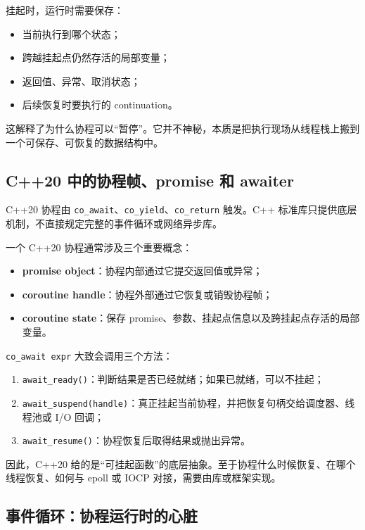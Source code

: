 \documentclass[UTF8,zihao=-4]{ctexart}
\begin{document}
挂起时，运行时需要保存：
\begin{itemize}
  \item 当前执行到哪个状态；
  \item 跨越挂起点仍然存活的局部变量；
  \item 返回值、异常、取消状态；
  \item 后续恢复时要执行的 continuation。
\end{itemize}

这解释了为什么协程可以“暂停”。它并不神秘，本质是把执行现场从线程栈上搬到一个可保存、可恢复的数据结构中。

\subsection{C++20 中的协程帧、promise 和 awaiter}

C++20 协程由 \texttt{co\_await}、\texttt{co\_yield}、\texttt{co\_return} 触发。C++ 标准库只提供底层机制，不直接规定完整的事件循环或网络异步库。

一个 C++20 协程通常涉及三个重要概念\cite{cppref}：

\begin{itemize}
  \item \textbf{promise object}：协程内部通过它提交返回值或异常；
  \item \textbf{coroutine handle}：协程外部通过它恢复或销毁协程帧；
  \item \textbf{coroutine state}：保存 promise、参数、挂起点信息以及跨挂起点存活的局部变量。
\end{itemize}

\texttt{co\_await expr} 大致会调用三个方法：

\begin{enumerate}
  \item \texttt{await\_ready()}：判断结果是否已经就绪；如果已就绪，可以不挂起；
  \item \texttt{await\_suspend(handle)}：真正挂起当前协程，并把恢复句柄交给调度器、线程池或 I/O 回调；
  \item \texttt{await\_resume()}：协程恢复后取得结果或抛出异常。
\end{enumerate}

因此，C++20 给的是“可挂起函数”的底层抽象。至于协程什么时候恢复、在哪个线程恢复、如何与 epoll 或 IOCP 对接，需要由库或框架实现。

\subsection{事件循环：协程运行时的心脏}
\end{document}
